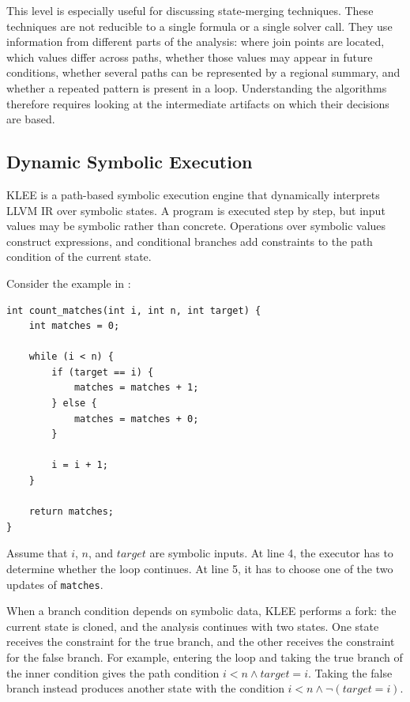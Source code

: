 \documentclass[conference]{IEEEtran}
\begin{document}
This level is especially useful for discussing state-merging techniques. These
techniques are not reducible to a single formula or a single solver call. They
use information from different parts of the analysis: where join points are
located, which values differ across paths, whether those values may appear in
future conditions, whether several paths can be represented by a regional
summary, and whether a repeated pattern is present in a loop. Understanding
the algorithms therefore requires looking at the intermediate artifacts on
which their decisions are based.

\subsection{Dynamic Symbolic Execution}
\label{sec:dse}

KLEE is a path-based symbolic execution engine that dynamically interprets LLVM IR over symbolic states. A program is executed step
by step, but input values may be symbolic rather than concrete. Operations over
symbolic values construct expressions, and conditional branches add constraints
to the path condition of the current state.

Consider the example in :

\begin{lstlisting}[style=cfull,caption={C loop with repeated symbolic branch.},label={lst:c-count-matches}]
int count_matches(int i, int n, int target) {
    int matches = 0;

    while (i < n) {
        if (target == i) {
            matches = matches + 1;
        } else {
            matches = matches + 0;
        }

        i = i + 1;
    }

    return matches;
}
\end{lstlisting}

Assume that \(i\), \(n\), and \(\mathit{target}\) are symbolic inputs. At line 4, the
executor has to determine whether the loop continues. At line 5, it has to
choose one of the two updates of \texttt{matches}.

When a branch condition depends on symbolic data, KLEE performs a fork: the
current state is cloned, and the analysis continues with two states. One state
receives the constraint for the true branch, and the other receives the
constraint for the false branch. For example, entering the loop and taking the
true branch of the inner condition gives the path condition
\(i < n \land \mathit{target} = i\). Taking the false branch instead produces another
state with the condition \(i < n \land \lnot(\mathit{target} = i)\).
\end{document}
